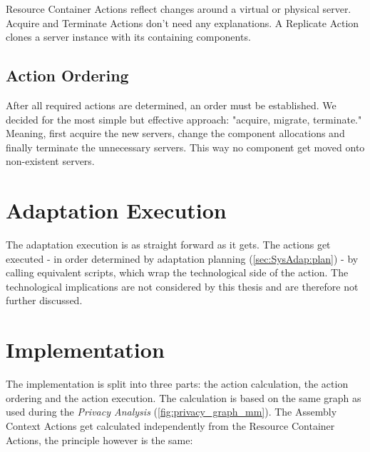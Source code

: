Resource Container Actions reflect changes around a virtual or physical server. Acquire and Terminate Actions don't need any explanations. A Replicate Action clones a server instance with its containing components.

\subsection{Action Ordering}

After all required actions are determined, an order must be established. We decided for the most simple but effective approach: "acquire, migrate, terminate." Meaning, first acquire the new servers, change the component allocations and finally terminate the unnecessary servers. This way no component get moved onto non-existent servers.






\section{Adaptation Execution}
\label{sec:SysAdap:exec}

The adaptation execution is as straight forward as it gets. The actions get executed - in order determined by adaptation planning (\autoref{sec:SysAdap:plan}) - by calling equivalent scripts, which wrap the technological side of the action. The technological implications are not considered by this thesis and are therefore not further discussed.



\section{Implementation}
\label{sec:SysAdap:impl}


The implementation is split into three parts: the action calculation, the action ordering and the action execution. The calculation is based on the same graph as used during the \textit{Privacy Analysis} (\autoref{fig:privacy_graph_mm}). The Assembly Context Actions get calculated independently from the Resource Container Actions, the principle however is the same:

